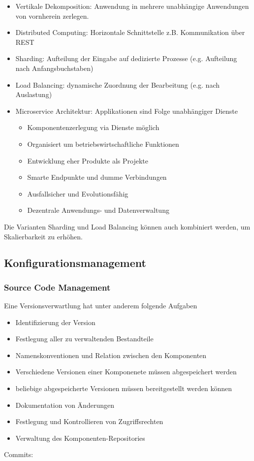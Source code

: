 \begin{itemize}
    \item Vertikale Dekomposition: Anwendung in mehrere unabhängige Anwendungen von vornherein zerlegen.
    \item Distributed Computing: Horizontale Schnittstelle z.B. Kommunikation über REST
    \item Sharding: Aufteilung der Eingabe auf dedizierte Prozesse (e.g. Aufteilung nach Anfangsbuchstaben)
    \item Load Balancing: dynamische Zuordnung der Bearbeitung (e.g. nach Auslastung)
    \item Microservice Architektur: Applikationen sind Folge unabhängiger Dienste
            \begin{itemize}
                \item Komponentenzerlegung via Dienste möglich
                \item Organisiert um betriebswirtschaftliche Funktionen
                \item Entwicklung eher Produkte als Projekte
                \item Smarte Endpunkte und dumme Verbindungen
                \item Ausfallsicher und Evolutionsfähig
                \item Dezentrale Anwendungs- und Datenverwaltung
            \end{itemize}
\end{itemize}
Die Varianten Sharding und Load Balancing können auch kombiniert werden, um Skalierbarkeit zu erhöhen.

\subsection{Konfigurationsmanagement}

\subsubsection{Source Code Management}

Eine Versionsverwartlung hat unter anderem folgende Aufgaben
\begin{itemize}
    \item Identifizierung der Version
    \item Festlegung aller zu verwaltenden Bestandteile
    \item Namenskonventionen und Relation zwischen den Komponenten
    \item Verschiedene Versionen einer Komponenete müssen abgespeichert werden
    \item beliebige abgespeicherte Versionen müssen bereitgestellt werden können
    \item Dokumentation von Änderungen
    \item Festlegung und Kontrollieren von Zugriffsrechten
    \item Verwaltung des Komponenten-Repositories
\end{itemize}
Commits:

